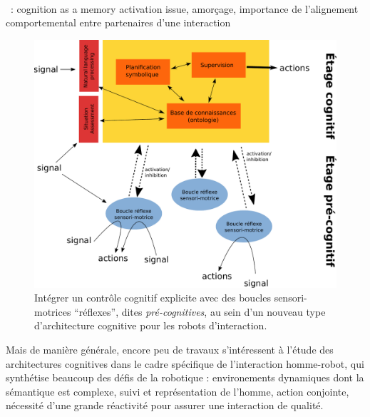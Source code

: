 \documentclass[a4paper]{article}
\begin{document}
~\cite{morse2010epigenetic}

~\cite{baxter2013cognitive}: cognition as a memory activation issue, amorçage, importance
de l'alignement comportemental entre partenaires d'une interaction

\begin{figure}
    \centering
    \includegraphics[width=0.8\linewidth]{archi}
    \caption{\small Intégrer un contrôle cognitif explicite avec des boucles
        sensori-motrices ``réflexes'', dites \emph{pré-cognitives}, au sein
    d'un nouveau type d'architecture cognitive pour les robots d'interaction.}
    \label{}
\end{figure}


Mais de manière générale, encore peu de travaux s'intéressent à l'étude des
architectures cognitives dans le cadre spécifique de l'interaction homme-robot,
qui synthétise beaucoup des défis de la robotique : environements dynamiques dont la
sémantique est complexe, suivi et représentation de l'homme, action conjointe,
nécessité d'une grande réactivité pour assurer une interaction de qualité.
\end{document}
